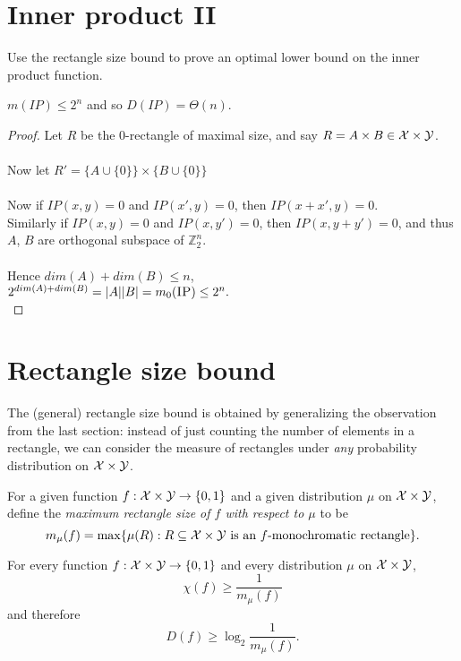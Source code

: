 \section{Inner product II}

Use the rectangle size bound to prove an optimal lower bound on the inner product function.

\begin{theorem}
	$m(IP) \le 2^{n}$ and so $D(IP) = \Theta(n)$.
\end{theorem}

\begin{proof}
	Let $R$ be the 0-rectangle of maximal size, and say $R=A\times B\in\mathcal{X} \times \mathcal{Y}$. \\
	\\
	Now let $R'=\{A\cup\{0\}\}\times\{B\cup\{0\}\}$\\
	\\
	Now if $IP(x,y) = 0$ and $IP(x',y) = 0$, then $IP(x+x',y) = 0$.\\
	Similarly if $IP(x,y) = 0$ and $IP(x,y') = 0$, then $IP(x,y+y') = 0$, and thus $A$, $B$ are orthogonal subspace of $\mathbb{Z}_2^n$.\\
	\\
	Hence $dim(A)+dim(B) \leq n$,\\
	$2^{dim(A)+dim(B)} = |A||B| = m_0(\textsc{IP}) \leq 2^n.$\\
\end{proof}


\section{Rectangle size bound}

The (general) rectangle size bound is obtained by generalizing the observation from the last section: instead of just counting the number of elements in a rectangle, we can consider the measure of rectangles under \emph{any} probability distribution on $\mathcal{X} \times \mathcal{Y}$.

\begin{definition}[$m_\mu(f)$]
	For a given function $f : \mathcal{X} \times \mathcal{Y} \to \{0,1\}$ and a given distribution $\mu$ on $\mathcal{X} \times \mathcal{Y}$, define the \emph{maximum rectangle size of $f$ with respect to $\mu$} to be
	\[
	m_\mu(f) = \max \{ \mu(R) : R \subseteq \mathcal{X} \times \mathcal{Y} \mbox{ is an $f$-monochromatic rectangle} \}.
	\]
\end{definition}


\begin{lemma}
	For every function $f : \mathcal{X} \times \mathcal{Y} \to \{0,1\}$ and every distribution $\mu$ on $\mathcal{X} \times \mathcal{Y}$, 
	\[
	\chi(f) \ge \frac1{m_\mu(f)}
	\]
	and therefore
	\[
	D(f) \ge \log_2 \frac{1}{m_\mu(f)}.
	\]
\end{lemma}

